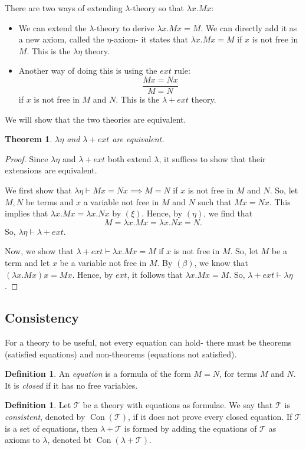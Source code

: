\documentclass[a4paper, openany]{memoir}
\newtheorem{theorem}[proposition]{Theorem}
\theoremstyle{definition}
\newtheorem{definition}[proposition]{Definition}
\begin{document}
    There are two ways of extending $\lambda$-theory so that $\lambda x.Mx$:
    \begin{itemize}
        \item We can extend the $\lambda$-theory to derive $\lambda x.Mx = M$. We can directly add it as a new axiom, called the $\eta$-axiom- it states that $\lambda x.Mx = M$ if $x$ is not free in $M$. This is the $\lambda \eta$ theory.
        \item Another way of doing this is using the $ext$ rule:
        \[\frac{Mx = Nx}{M = N}\]
        if $x$ is not free in $M$ and $N$. This is the $\lambda + ext$ theory. 
    \end{itemize}
    We will show that the two theories are equivalent.
    \begin{theorem}
        $\lambda \eta$ and $\lambda + ext$ are equivalent.
    \end{theorem}
    \begin{proof}
        Since $\lambda \eta$ and $\lambda + ext$ both extend $\lambda$, it suffices to show that their extensions are equivalent.

        We first show that $\lambda \eta \vdash Mx = Nx \implies M = N$ if $x$ is not free in $M$ and $N$. So, let $M, N$ be terms and $x$ a variable not free in $M$ and $N$ such that $Mx = Nx$. This implies that $\lambda x.Mx = \lambda x.Nx$ by $(\xi)$. Hence, by $(\eta)$, we find that
        \[M = \lambda x.Mx = \lambda x.Nx = N.\]
        So, $\lambda \eta \vdash \lambda + ext$.

        Now, we show that $\lambda + ext \vdash \lambda x.Mx = M$ if $x$ is not free in $M$. So, let $M$ be a term and let $x$ be a variable not free in $M$. By $(\beta)$, we know that $(\lambda x.Mx)x = Mx$. Hence, by $ext$, it follows that $\lambda x.Mx = M$. So, $\lambda + ext \vdash \lambda \eta$.
    \end{proof}

    \subsection{Consistency}
    For a theory to be useful, not every equation can hold- there must be theorems (satisfied equations) and non-theorems (equations not satisfied).
    \begin{definition}
        An \emph{equation} is a formula of the form $M = N$, for terms $M$ and $N$. It is \emph{closed} if it has no free variables.
    \end{definition}
    \begin{definition}
        Let $\mathcal{T}$ be a theory with equations as formulae. We say that $\mathcal{T}$ is \emph{consistent}, denoted by $\operatorname{Con}(\mathcal{T})$, if it does not prove every closed equation. If $\mathcal{T}$ is a set of equations, then $\lambda + \mathcal{T}$ is formed by adding the equations of $\mathcal{T}$ as axioms to $\lambda$, denoted bt $\operatorname{Con}(\lambda + \mathcal{T})$. 
    \end{definition}
\end{document}
